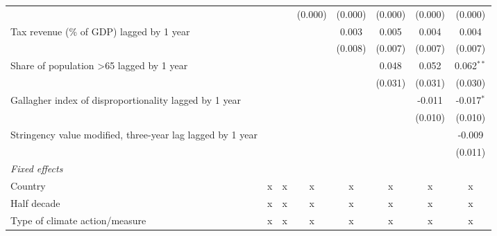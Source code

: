 \begin{tabular}{lccccccc}
                                                                           &               &               & (0.000)       & (0.000)       & (0.000)       & (0.000)      & (0.000)\\   
   Tax revenue (\% of GDP) lagged by 1 year                                &               &               &               & 0.003         & 0.005         & 0.004        & 0.004\\   
                                                                           &               &               &               & (0.008)       & (0.007)       & (0.007)      & (0.007)\\   
   Share of population >65 lagged by 1 year                                &               &               &               &               & 0.048         & 0.052        & 0.062$^{**}$\\   
                                                                           &               &               &               &               & (0.031)       & (0.031)      & (0.030)\\   
   Gallagher index of disproportionality lagged by 1 year                  &               &               &               &               &               & -0.011       & -0.017$^{*}$\\   
                                                                           &               &               &               &               &               & (0.010)      & (0.010)\\   
   Stringency value modified, three-year lag lagged by 1 year              &               &               &               &               &               &              & -0.009\\   
                                                                           &               &               &               &               &               &              & (0.011)\\   
   \emph{Fixed effects}\\
   Country                                                                 & x             & x             & x             & x             & x             & x            & x\\  
   Half decade                                                             & x             & x             & x             & x             & x             & x            & x\\  
   Type of climate action/measure                                          & x             & x             & x             & x             & x             & x            & x\\  

\end{tabular}
